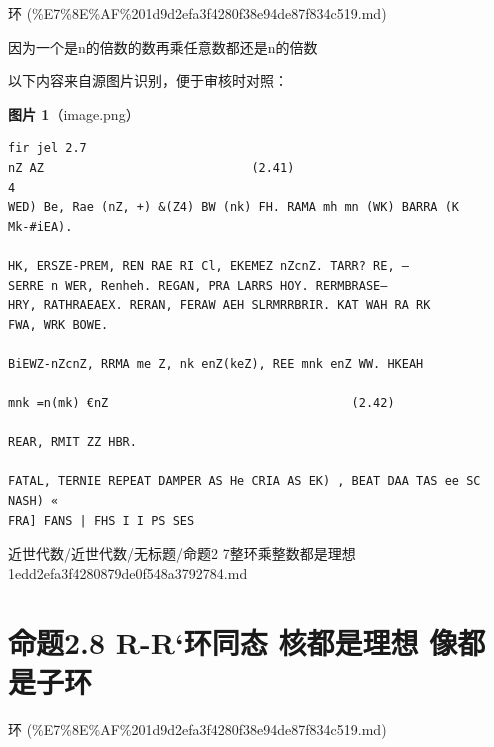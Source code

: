 \begin{note}[来源上级主题]

环 (\%E7\%8E\%AF\%201d9d2efa3f4280f38e94de87f834c519.md)

\end{note}

\begin{proposition}[命题2.7整环乘整数都是理想]

因为一个是n的倍数的数再乘任意数都还是n的倍数

\end{proposition}

\begin{note}
以下内容来自源图片识别，便于审核时对照：

\textbf{图片 1}（image.png）
\begin{Verbatim}[fontsize=\small]
fir jel 2.7
nZ AZ                             (2.41)
4
WED) Be, Rae (nZ, +) &(Z4) BW (nk) FH. RAMA mh mn (WK) BARRA (K
Mk-#iEA).

HK, ERSZE-PREM, REN RAE RI Cl, EKEMEZ nZcnZ. TARR? RE, —
SERRE n WER, Renheh. REGAN, PRA LARRS HOY. RERMBRASE—
HRY, RATHRAEAEX. RERAN, FERAW AEH SLRMRRBRIR. KAT WAH RA RK
FWA, WRK BOWE.

BiEWZ-nZcnZ, RRMA me Z, nk enZ(keZ), REE mnk enZ WW. HKEAH

mnk =n(mk) €nZ                                  (2.42)

REAR, RMIT ZZ HBR.

FATAL, TERNIE REPEAT DAMPER AS He CRIA AS EK) , BEAT DAA TAS ee SC NASH) «
FRA] FANS | FHS I I PS SES
\end{Verbatim}

\end{note}

\begin{note}[来源路径]

近世代数/近世代数/无标题/命题2 7整环乘整数都是理想 1edd2efa3f4280879de0f548a3792784.md

\end{note}

\section*{命题2.8 R-R‘环同态 核都是理想 像都是子环}

\begin{note}[来源上级主题]

环 (\%E7\%8E\%AF\%201d9d2efa3f4280f38e94de87f834c519.md)

\end{note}

